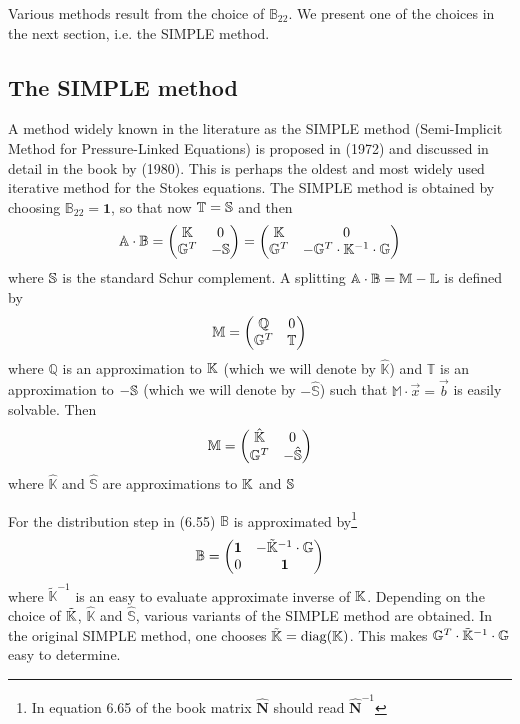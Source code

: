 Various methods result from the choice of $\mathbb{B}_{22}$. We present one of the choices in
the next section, i.e. the SIMPLE method.

\subsection*{The SIMPLE method}

A method widely known in the literature as the SIMPLE method (Semi-Implicit Method for
Pressure-Linked Equations) is proposed in \textcite{pasp72} (1972) and discussed in detail in the book by \textcite{patankar1980} (1980). This is perhaps the oldest and most widely used iterative method
for the Stokes equations. The SIMPLE method is obtained by choosing 
$\mathbb{B}_{22}={\bm 1}$, so that now $\mathbb{T}={\mathbb{S}}$ and then
\[
{\mathbb A}\cdot {\mathbb B}  
=
\begin{pmatrix}
{\mathbb{K}} & 0 \\
{\mathbb{G}}^T & - {\mathbb{S}}
\end{pmatrix}
=
\begin{pmatrix}
{\mathbb{K}} & 0 \\
{\mathbb{G}}^T & - {\mathbb{G}}^T \cdot {\mathbb{K}}^{-1} \cdot {\mathbb{G}} 
\end{pmatrix}
\]
where ${\mathbb{S}}$ is the standard Schur complement.
A splitting ${\mathbb A}\cdot {\mathbb B} = {\mathbb{M}}-\mathbb{L}$ is defined by
\[
\mathbb{M}
=
\begin{pmatrix}
\mathbb{Q} & 0 \\
{\mathbb{G}}^T & \mathbb{T}
\end{pmatrix}
\]
where $\mathbb{Q}$ is an approximation to ${\mathbb{K}}$ (which we will
denote by $\hat{\mathbb{K}}$)
and $\mathbb{T}$ is an approximation to $-{\mathbb{S}}$
(which we will denote by $-\hat{\mathbb{S}}$)
such that $\mathbb{M}\cdot \vec{x} = \vec{b}$ is easily solvable.
Then
\[
\mathbb{M}=
\begin{pmatrix}
\hat{\mathbb{K}} & 0 \\
{\mathbb{G}}^T & -\hat{\mathbb{S}}
\end{pmatrix}
\]
where $\hat{\mathbb{K}}$ and $\hat{\mathbb{S}}$ are approximations to ${\mathbb{K}}$ 
and ${\mathbb{S}} $ 

For the distribution step in (6.55) $\mathbb{B}$ is approximated by\footnote{In 
equation 6.65 of the book matrix $\hat{\bm N}$ should read $\hat{\bm N}^{-1}$}
\[
{\mathbb B} = 
\begin{pmatrix}
{\bm 1} & -\tilde{{\mathbb{K}}}^{-1} \cdot {\mathbb{G}} \\
0 &  {\bm 1} 
\end{pmatrix}
\]
where $\tilde{\mathbb{K}}^{-1}$ is an easy to evaluate approximate inverse of ${\mathbb{K}}$.
Depending on the choice of $\tilde{{\mathbb{K}}}$, $\hat{\mathbb{K}}$ and $\hat{\mathbb{S}}$, 
various variants of the SIMPLE method are obtained.
In the original SIMPLE method, one chooses $\tilde{{\mathbb{K}}} =\text{diag}({\mathbb{K}})$. 
This makes ${\mathbb{G}}^T \cdot \tilde{{\mathbb{K}}}^{-1} \cdot {\mathbb{G}}$   easy to determine.

